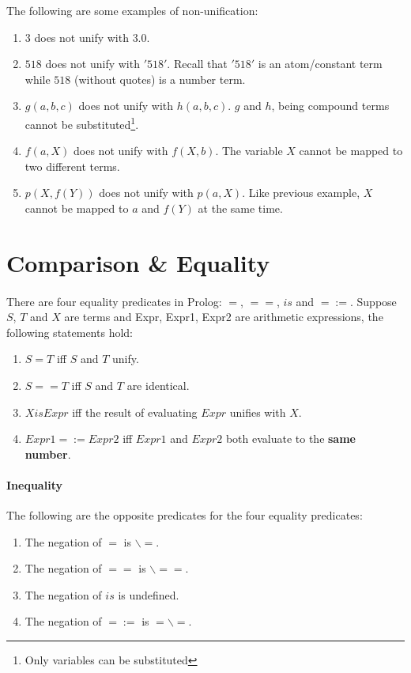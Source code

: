 \documentclass{article}
\begin{document}
\begin{multicols}{2}
  The following are some examples of non-unification:
  
  \begin{enumerate}
  \item $3$ does not unify with $3.0$.
  \item $518$ does not unify with $'518'$. Recall that $'518'$ is an atom/constant term while $518$ (without quotes) is a number term.
  \item $g(a, b, c)$ does not unify with $h(a, b, c)$. $g$ and $h$, being compound terms cannot be substituted\footnote{Only variables can be substituted}.
  \item $f(a, X)$ does not unify with $f(X, b)$. The variable $X$ cannot be mapped to two different terms.
  \item $p(X, f(Y))$ does not unify with $p(a, X)$. Like previous example, $X$ cannot be mapped to $a$ and $f(Y)$ at the same time.
  \end{enumerate}
  
  \section{Comparison \& Equality}
  
  \paragraph{} There are four equality predicates in Prolog: $=$, $==$, $is$ and $=:=$. Suppose $S$, $T$ and $X$ are terms and Expr, Expr1, Expr2 are arithmetic expressions, the following statements hold:
  
  \begin{enumerate}
  \item $S = T$ iff $S$ and $T$ unify.
  \item $S == T$ iff $S$ and $T$ are identical.
  \item $X is Expr$ iff the result of evaluating $Expr$ unifies with $X$.
  \item $Expr1 =:= Expr2$ iff $Expr1$ and $Expr2$ both evaluate to the {\bf same number}.
  \end{enumerate}
  
  \paragraph{Inequality} The following are the opposite predicates for the four equality predicates:
  
  \begin{enumerate}
  \item The negation of $=$ is $\backslash=$.
  \item The negation of $==$ is $\backslash==$.
  \item The negation of $is$ is undefined.
  \item The negation of $=:=$ is $=\backslash=$.
  \end{enumerate}
  

\end{multicols}
\end{document}
